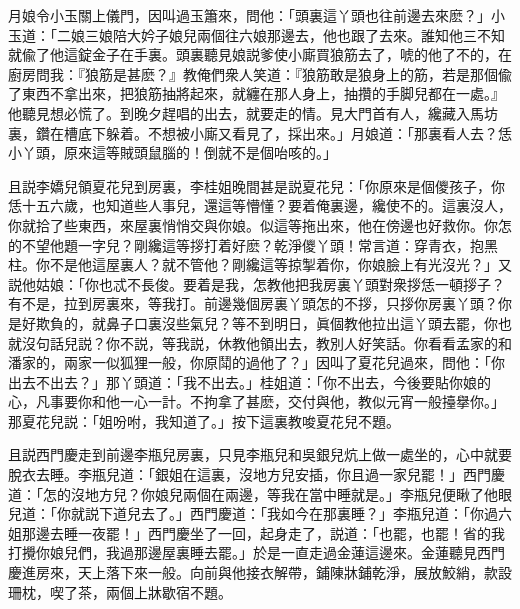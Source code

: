 月娘令小玉關上儀門，因叫過玉簫來，問他：「頭裏這丫頭也往前邊去來麽？」小玉道：「二娘三娘陪大妗子娘兒兩個往六娘那邊去，他也跟了去來。誰知他三不知就偸了他這錠金子在手裏。頭裏聽見娘説爹使小廝買狼筋去了，唬的他了不的，在廚房問我：『狼筋是甚麽？』教俺們衆人笑道：『狼筋敢是狼身上的筋，若是那個偸了東西不拿出來，把狼筋抽將起來，就纏在那人身上，抽攢的手脚兒都在一處。』他聽見想必慌了。到晚夕趕唱的出去，就要走的情。見大門首有人，纔藏入馬坊裏，鑽在槽底下躲着。不想被小廝又看見了，採出來。」月娘道：「那裏看人去？恁小丫頭，原來這等賊頭鼠腦的！倒就不是個咍咳的。」

且説李嬌兒領夏花兒到房裏，李桂姐晚間甚是説夏花兒：「你原來是個儍孩子，你恁十五六歲，也知道些人事兒，還這等懵懂？要着俺裏邊，纔使不的。這裏沒人，你就拾了些東西，來屋裏悄悄交與你娘。似這等拖出來，他在傍邊也好救你。你怎的不望他題一字兒？剛纔這等拶打着好麽？乾淨儍丫頭！常言道：穿青衣，抱黑柱。你不是他這屋裏人？就不管他？剛纔這等掠掣着你，你娘臉上有光沒光？」又説他姑娘：「你也忒不長俊。要着是我，怎教他把我房裏丫頭對衆拶恁一頓拶子？有不是，拉到房裏來，等我打。前邊幾個房裏丫頭怎的不拶，只拶你房裏丫頭？你是好欺負的，就鼻子口裏沒些氣兒？等不到明日，眞個教他拉出這丫頭去罷，你也就沒句話兒説？你不説，等我説，休教他領出去，教別人好笑話。你看看孟家的和潘家的，兩家一似狐狸一般，你原鬦的過他了？」因叫了夏花兒過來，問他：「你出去不出去？」那丫頭道：「我不出去。」桂姐道：「你不出去，今後要貼你娘的心，凡事要你和他一心一計。不拘拿了甚麽，交付與他，教似元宵一般擡擧你。」那夏花兒説：「姐吩咐，我知道了。」按下這裏教唆夏花兒不題。

且説西門慶走到前邊李瓶兒房裏，只見李瓶兒和吳銀兒炕上做一處坐的，心中就要脫衣去睡。李瓶兒道：「銀姐在這裏，沒地方兒安插，你且過一家兒罷！」西門慶道：「怎的沒地方兒？你娘兒兩個在兩邊，等我在當中睡就是。」李瓶兒便瞅了他眼兒道：「你就説下道兒去了。」西門慶道：「我如今在那裏睡？」李瓶兒道：「你過六姐那邊去睡一夜罷！」西門慶坐了一回，起身走了，説道：「也罷，也罷！省的我打攪你娘兒們，我過那邊屋裏睡去罷。」於是一直走過金蓮這邊來。金蓮聽見西門慶進房來，天上落下來一般。向前與他接衣解帶，鋪陳牀鋪乾淨，展放鮫綃，款設珊枕，喫了茶，兩個上牀歇宿不題。

